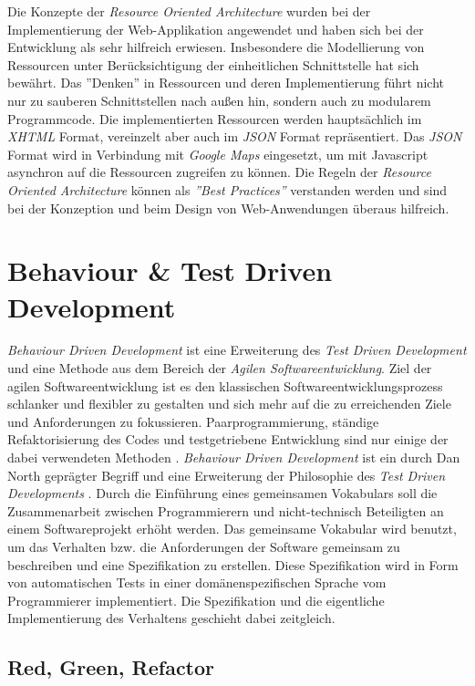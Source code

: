 Die Konzepte der \textit{Resource Oriented Architecture} wurden bei
der Implementierung der Web-Applikation angewendet und haben sich bei
der Entwicklung als sehr hilfreich erwiesen. Insbesondere die
Modellierung von Ressourcen unter Berücksichtigung der einheitlichen
Schnittstelle hat sich bewährt. Das ''Denken'' in Ressourcen und deren
Implementierung führt nicht nur zu sauberen Schnittstellen nach außen
hin, sondern auch zu modularem Programmcode. Die implementierten
Ressourcen werden hauptsächlich im \textit{XHTML} Format, vereinzelt
aber auch im \textit{JSON} Format repräsentiert. Das \textit{JSON}
Format wird in Verbindung mit \textit{Google Maps} eingesetzt, um mit
Javascript asynchron auf die Ressourcen zugreifen zu können. Die
Regeln der \textit{Resource Oriented Architecture} können als
\textit{''Best Practices''} verstanden werden und sind bei der
Konzeption und beim Design von Web-Anwendungen überaus hilfreich.

\section{Behaviour \& Test Driven Development}

\textit{Behaviour Driven Development} ist eine Erweiterung des
\textit{Test Driven Development} und eine Methode aus dem Bereich der
\textit{Agilen Softwareentwicklung}. Ziel der agilen
Softwareentwicklung ist es den klassischen Softwareentwicklungsprozess
schlanker und flexibler zu gestalten und sich mehr auf die zu
erreichenden Ziele und Anforderungen zu
fokussieren. Paarprogrammierung, ständige Refaktorisierung des Codes
und testgetriebene Entwicklung sind nur einige der dabei verwendeten
Methoden \cite{wiki:agile}. \textit{Behaviour Driven Development} ist
ein durch Dan North geprägter Begriff und eine Erweiterung der
Philosophie des \textit{Test Driven Developments}
\cite{wiki:bdd}. Durch die Einführung eines gemeinsamen Vokabulars
soll die Zusammenarbeit zwischen Programmierern und nicht-technisch
Beteiligten an einem Softwareprojekt erhöht werden. Das gemeinsame
Vokabular wird benutzt, um das Verhalten bzw. die Anforderungen der
Software gemeinsam zu beschreiben und eine Spezifikation zu erstellen.
Diese Spezifikation wird in Form von automatischen Tests in einer
domänen\-spezifischen Sprache vom Programmierer implementiert. Die
Spezifikation und die eigentliche Implementierung des Verhaltens
geschieht dabei zeitgleich.

\subsection{Red, Green, Refactor}


